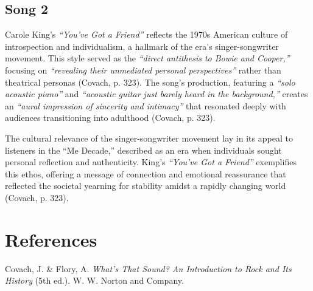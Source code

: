 \documentclass[12pt]{article}
\begin{document}
\subsection*{Song 2}
Carole King’s \textit{“You’ve Got a Friend”} reflects the 1970s American culture of introspection and individualism, a hallmark of the era’s singer-songwriter movement. This style served as the \textit{“direct antithesis to Bowie and Cooper,”} focusing on \textit{“revealing their unmediated personal perspectives”} rather than theatrical personas (Covach, p. 323). The song’s production, featuring a \textit{“solo acoustic piano”} and \textit{“acoustic guitar just barely heard in the background,”} creates an \textit{“aural impression of sincerity and intimacy”} that resonated deeply with audiences transitioning into adulthood (Covach, p. 323).

The cultural relevance of the singer-songwriter movement lay in its appeal to listeners in the “Me Decade,” described as an era when individuals sought personal reflection and authenticity. King’s \textit{“You’ve Got a Friend”} exemplifies this ethos, offering a message of connection and emotional reassurance that reflected the societal yearning for stability amidst a rapidly changing world (Covach, p. 323).

\section*{References}

Covach, J. \& Flory, A. \textit{What’s That Sound? An Introduction to Rock and Its History} (5th ed.). W. W. Norton and Company.
\end{document}
